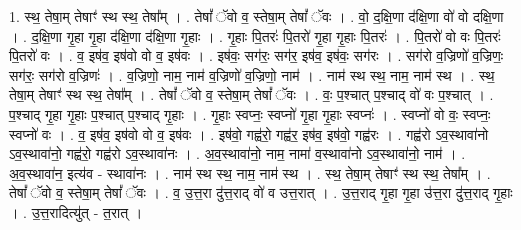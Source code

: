\documentclass[17pt]{extarticle}
\begin{document}
1. स्थ॒ तेषा॒म् तेषाꣳ॑ स्थ स्थ॒ तेषा᳚म् । . तेषां᳚ ॅवो व॒ स्तेषा॒म् तेषां᳚ ॅवः । . वो॒ द॒क्षि॒णा द॑क्षि॒णा वो॑ वो दक्षि॒णा । . द॒क्षि॒णा गृ॒हा गृ॒हा द॑क्षि॒णा द॑क्षि॒णा गृ॒हाः । . गृ॒हाः पि॒तरः॑ पि॒तरो॑ गृ॒हा गृ॒हाः पि॒तरः॑ । . पि॒तरो॑ वो वः पि॒तरः॑ पि॒तरो॑ वः । . व॒ इष॑व॒ इष॑वो वो व॒ इष॑वः । . इष॑वः॒ सग॑रः॒ सग॑र॒ इष॑व॒ इष॑वः॒ सग॑रः । . सग॑रो व॒ज्रिणो॑ व॒ज्रिणः॒ सग॑रः॒ सग॑रो व॒ज्रिणः॑ । . व॒ज्रिणो॒ नाम॒ नाम॑ व॒ज्रिणो॑ व॒ज्रिणो॒ नाम॑ । . नाम॑ स्थ स्थ॒ नाम॒ नाम॑ स्थ । . स्थ॒ तेषा॒म् तेषाꣳ॑ स्थ स्थ॒ तेषा᳚म् । . तेषां᳚ ॅवो व॒ स्तेषा॒म् तेषां᳚ ॅवः । . वः॒ प॒श्चात् प॒श्चाद् वो॑ वः प॒श्चात् । . प॒श्चाद् गृ॒हा गृ॒हाः प॒श्चात् प॒श्चाद् गृ॒हाः । . गृ॒हाः स्वप्नः॒ स्वप्नो॑ गृ॒हा गृ॒हाः स्वप्नः॑ । . स्वप्नो॑ वो वः॒ स्वप्नः॒ स्वप्नो॑ वः । . व॒ इष॑व॒ इष॑वो वो व॒ इष॑वः । . इष॑वो॒ गह्व॑रो॒ गह्व॑र॒ इष॑व॒ इष॑वो॒ गह्व॑रः । . गह्व॑रो ऽव॒स्थावा॑नो ऽव॒स्थावा॑नो॒ गह्व॑रो॒ गह्व॑रो ऽव॒स्थावा॑नः । . अ॒व॒स्थावा॑नो॒ नाम॒ नामा॑ व॒स्थावा॑नो ऽव॒स्थावा॑नो॒ नाम॑ । . अ॒व॒स्थावा॑न॒ इत्य॑व - स्थावा॑नः । . नाम॑ स्थ स्थ॒ नाम॒ नाम॑ स्थ । . स्थ॒ तेषा॒म् तेषाꣳ॑ स्थ स्थ॒ तेषा᳚म् । . तेषां᳚ ॅवो व॒ स्तेषा॒म् तेषां᳚ ॅवः । . व॒ उ॒त्त॒रा दु॑त्त॒राद् वो॑ व उत्त॒रात् । . उ॒त्त॒राद् गृ॒हा गृ॒हा उ॑त्त॒रा दु॑त्त॒राद् गृ॒हाः । . उ॒त्त॒रादित्यु॑त् - त॒रात् । \newline
\end{document}
